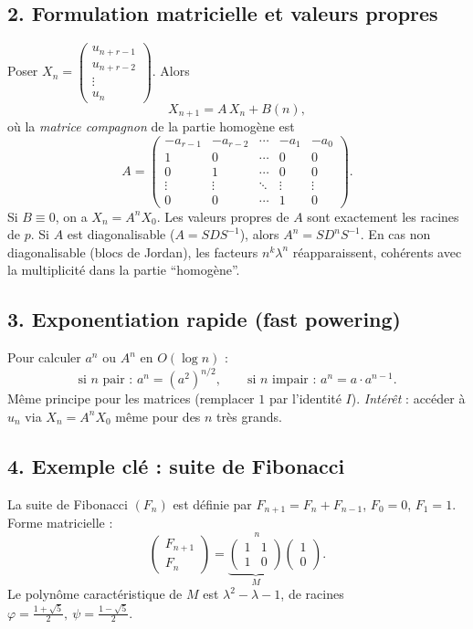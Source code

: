 \subsection*{2. Formulation matricielle et valeurs propres}
Poser $X_n=\begin{pmatrix}u_{n+r-1}\\ u_{n+r-2}\\ \vdots\\ u_{n}\end{pmatrix}$. Alors 
\[
X_{n+1}=A\,X_n+B(n),
\]
où la \emph{matrice compagnon} de la partie homogène est
\[
A=\begin{pmatrix}
 -a_{r-1} & -a_{r-2} & \cdots & -a_1 & -a_0\\
 1 & 0 & \cdots & 0 & 0\\
 0 & 1 & \cdots & 0 & 0\\
 \vdots & \vdots & \ddots & \vdots & \vdots\\
 0 & 0 & \cdots & 1 & 0
\end{pmatrix}.
\]
Si $B\equiv 0$, on a $X_n=A^n X_0$. Les valeurs propres de $A$ sont exactement les racines de $p$.
Si $A$ est diagonalisable ($A=SDS^{-1}$), alors $A^n=SD^nS^{-1}$. 
En cas non diagonalisable (blocs de Jordan), les facteurs $n^k\lambda^n$ réapparaissent, cohérents avec la multiplicité dans la partie “homogène”.

\subsection*{3. Exponentiation rapide (fast powering)}
Pour calculer $a^n$ ou $A^n$ en $O(\log n)$ :
\[
\text{si } n \text{ pair : } a^n=(a^2)^{n/2}, 
\qquad 
\text{si } n \text{ impair : } a^n=a\cdot a^{n-1}.
\]
Même principe pour les matrices (remplacer $1$ par l’identité $I$). 
\textit{Intérêt} : accéder à $u_n$ via $X_n=A^nX_0$ même pour des $n$ très grands.

\subsection*{4. Exemple clé : suite de Fibonacci}
La suite de Fibonacci $(F_n)$ est définie par $F_{n+1}=F_n+F_{n-1}$, $F_0=0$, $F_1=1$. 
Forme matricielle :
\[
\begin{pmatrix}F_{n+1}\\ F_n\end{pmatrix}
=
\underbrace{\begin{pmatrix}1&1\\1&0\end{pmatrix}}_{M}^{\;n}
\begin{pmatrix}1\\0\end{pmatrix}.
\]
Le polynôme caractéristique de $M$ est $\lambda^2-\lambda-1$, de racines 
\(
\varphi=\frac{1+\sqrt5}{2},\ \psi=\frac{1-\sqrt5}{2}.
\)


